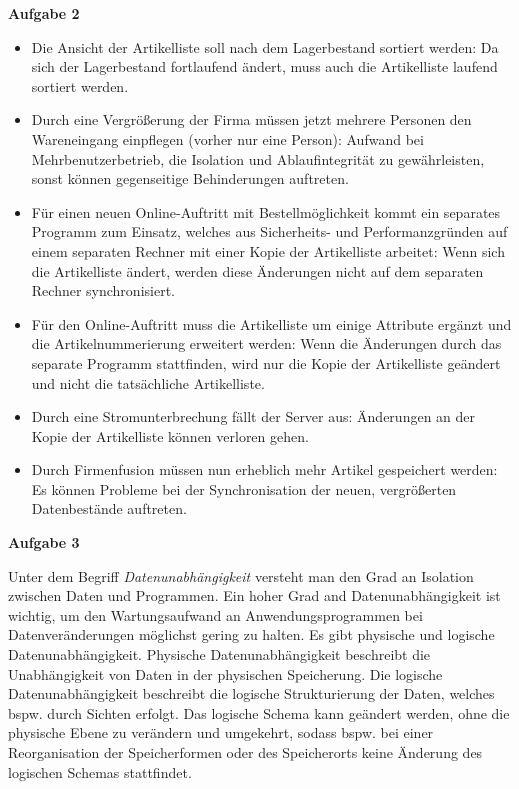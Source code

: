 \documentclass[a4paper,12pt]{article}
\newcommand{\Aufgabe}[1]{
        {
        \vspace*{0.5cm}
        \textbf{Aufgabe #1}
        \vspace*{0.2cm}
    }
}
\begin{document}
    \Aufgabe{2}
    \begin{itemize}
        \item Die Ansicht der Artikelliste soll nach dem Lagerbestand sortiert werden:
        \newline Da sich der Lagerbestand fortlaufend ändert, muss auch die Artikelliste laufend sortiert werden.
        \item Durch eine Vergrößerung der Firma müssen jetzt mehrere Personen den Wareneingang einpflegen
        (vorher nur eine Person):
        \newline Aufwand bei Mehrbenutzerbetrieb, die Isolation und Ablaufintegrität zu gewährleisten, sonst können
        gegenseitige Behinderungen auftreten.
        \item Für einen neuen Online-Auftritt mit Bestellmöglichkeit kommt ein separates Programm zum Einsatz,
        welches aus Sicherheits- und Performanzgründen auf einem separaten Rechner mit einer Kopie der Artikelliste arbeitet:
        \newline Wenn sich die Artikelliste ändert, werden diese Änderungen nicht auf dem separaten Rechner synchronisiert.
        \item Für den Online-Auftritt muss die Artikelliste um einige Attribute ergänzt und die Artikelnummerierung erweitert werden:
        \newline Wenn die Änderungen durch das separate Programm stattfinden, wird nur die Kopie der Artikelliste
        geändert und nicht die tatsächliche Artikelliste.
        \item Durch eine Stromunterbrechung fällt der Server aus:
        \newline Änderungen an der Kopie der Artikelliste können verloren gehen.
        \item Durch Firmenfusion müssen nun erheblich mehr Artikel gespeichert werden:
        \newline Es können Probleme bei der Synchronisation der neuen, vergrößerten Datenbestände auftreten.
    \end{itemize}

    \Aufgabe{3}
    \newline Unter dem Begriff \emph{Datenunabhängigkeit} versteht man den Grad an Isolation zwischen Daten und Programmen.
    Ein hoher Grad and Datenunabhängigkeit ist wichtig, um den Wartungsaufwand an Anwendungsprogrammen bei Datenveränderungen
    möglichst gering zu halten. Es gibt physische und logische Datenunabhängigkeit. Physische Datenunabhängigkeit
    beschreibt die Unabhängigkeit von Daten in der physischen Speicherung. Die logische Datenunabhängigkeit
    beschreibt die logische Strukturierung der Daten, welches bspw. durch Sichten erfolgt. Das logische Schema kann geändert
    werden, ohne die physische Ebene zu verändern und umgekehrt, sodass bspw. bei einer Reorganisation der Speicherformen
    oder des Speicherorts keine Änderung des logischen Schemas stattfindet.

    \newpage

\end{document}
